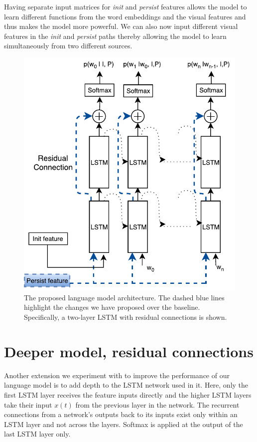 Having separate input matrices for \emph{init} and \emph{persist} features
allows the model to learn different functions from the word embeddings and the
visual features and thus makes the model more powerful.
We can also now input different visual features in the \emph{init} and
\emph{persist} paths thereby allowing the model to learn simultaneously from two
different sources.

\begin{figure}[t]
\begin{center}
  \includegraphics[width=0.7\linewidth]{images/MultilayerResidualLSTM.pdf}
\end{center}
\vspace*{-4mm}
\caption{The proposed language model architecture. The dashed blue lines
        highlight the changes we have proposed over the baseline. 
        Specifically, a two-layer LSTM with residual connections is
        shown.}
\label{fig:proplstmlang}
\end{figure}

\section{Deeper model, residual connections }
Another extension we experiment with to improve the performance of our language
model is to add depth to the LSTM network used in it.
Here, only the first LSTM layer receives the feature inputs directly and the
higher LSTM layers take their input $x(t)$ from the previous layer in the
network.
The recurrent connections from a network's outputs back to its inputs exist only
within an LSTM layer and not across the layers.
Softmax is applied at the output of the last LSTM layer only.

